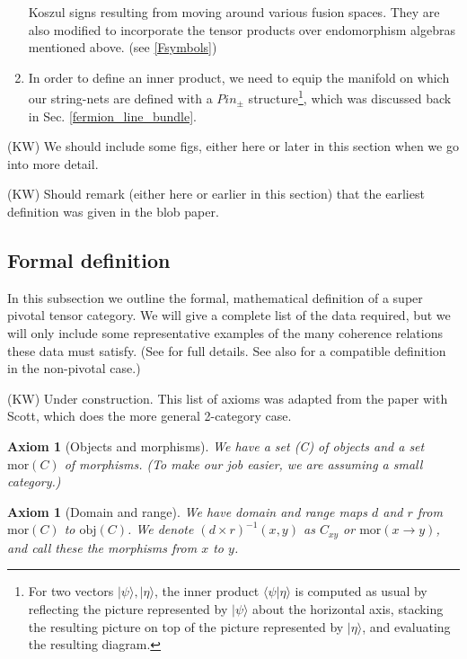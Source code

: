 \documentclass[12pt,a4paper]{article}
\newtheorem{axiom}[theorem]{Axiom}
\newcommand{\mor}{\text{mor}}
\newcommand{\obj}{\text{obj}}
\newcommand{\kw}[1]{{\color{kwcolor}\footnotesize{(KW) #1}}}
\begin{document}
\begin{enumerate}
	 Koszul signs resulting from moving around various fusion spaces. 
	 They are also modified to incorporate the tensor products over endomorphism algebras mentioned above. (see \ref{Fsymbols})
	\item In order to define an inner product, we need to equip the manifold on which our string-nets are defined with a $Pin_\pm$ structure\footnote{For two vectors $|\psi\rangle,|\eta\rangle$, the inner product $\langle \psi | \eta \rangle$ is computed as usual by reflecting the picture represented by $|\psi\rangle$ about the horizontal axis, stacking the resulting picture on top of the picture represented by $|\eta\rangle$, and evaluating the resulting diagram.}, which was discussed back in Sec. \ref{fermion_line_bundle}.
\end{enumerate}

\kw{We should include some figs, either here or later in this section when we go into more detail.}

\kw{Should remark (either here or earlier in this section) that the earliest definition was given in the blob paper.}



\subsection{Formal definition}

In this subsection we outline the formal, mathematical definition of a super pivotal tensor category.
We will give a complete list of the data required, but we will only include some representative
examples of the many coherence relations these data must satisfy.
(See \cite{MW-in-prep} for full details.  See also \cite{xxxx} for a compatible definition in the non-pivotal case.)



\kw{Under construction.
This list of axioms was adapted from the paper with Scott, which does the more general
2-category case.}

\begin{axiom}[Objects and morphisms]
We have a set \obj(C) of objects and a set $\mor(C)$ of morphisms.
(To make our job easier, we are assuming a small category.)
\end{axiom}

\begin{axiom}[Domain and range]
We have domain and range maps $d$ and $r$ from $\mor(C)$ to $\obj(C)$.
We denote $(d \times r)^{-1}(x, y)$ as $C_{xy}$ or $\mor(x \to y)$, and call these
the morphisms from $x$ to $y$.
\end{axiom}
\end{document}

